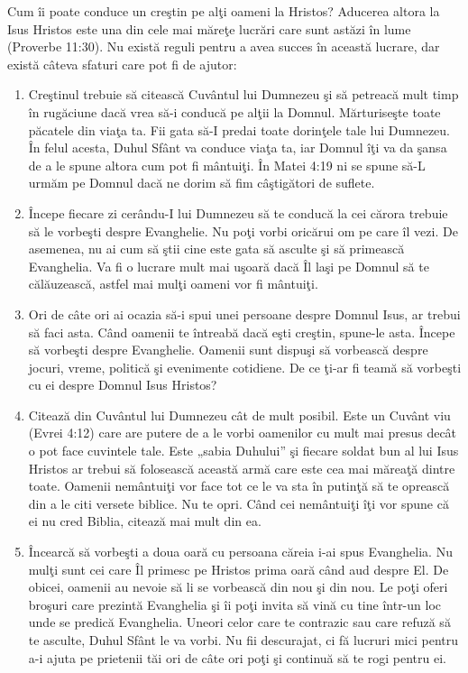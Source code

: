\newpage


Cum îi poate conduce un creştin pe alţi oameni la Hristos? Aducerea altora la Isus Hristos este una din cele mai măreţe lucrări care sunt astăzi în lume (Proverbe 11:30). Nu există reguli pentru a avea succes în această lucrare, dar există câteva sfaturi care pot fi de ajutor:

\begin{enumerate}

	\item Creştinul trebuie să citească Cuvântul lui Dumnezeu şi să petreacă mult timp în rugăciune dacă vrea să-i conducă pe alţii la Domnul. Mărturiseşte toate păcatele din viaţa ta. Fii gata să-I predai toate dorinţele tale lui Dumnezeu. În felul acesta, Duhul Sfânt va conduce viaţa ta, iar Domnul îţi va da şansa de a le spune altora cum pot fi mântuiţi. În Matei 4:19 ni se spune să-L urmăm pe Domnul dacă ne dorim să fim câştigători de suflete.
	
	\item Începe fiecare zi cerându-I lui Dumnezeu să te conducă la cei cărora trebuie să le vorbeşti despre Evanghelie. Nu poţi vorbi oricărui om pe care îl vezi. De asemenea, nu ai cum să ştii cine este gata să asculte şi să primească Evanghelia. Va fi o lucrare mult mai uşoară dacă Îl laşi pe Domnul să te călăuzească, astfel mai mulţi oameni vor fi mântuiţi.
	
	\item Ori de câte ori ai ocazia să-i spui unei persoane despre Domnul Isus, ar trebui să faci asta. Când oamenii te întreabă dacă eşti creştin, spune-le asta. Începe să vorbeşti despre Evanghelie. Oamenii sunt dispuşi să vorbească despre jocuri, vreme, politică şi evenimente cotidiene. De ce ţi-ar fi teamă să vorbeşti cu ei despre Domnul Isus Hristos?
	
	\item Citează din Cuvântul lui Dumnezeu cât de mult posibil. Este un Cuvânt viu (Evrei 4:12) care are putere de a le vorbi oamenilor cu mult mai presus decât o pot face cuvintele tale. Este „sabia Duhului” şi fiecare soldat bun al lui Isus Hristos ar trebui să folosească această armă care este cea mai măreaţă dintre toate. Oamenii nemântuiţi vor face tot ce le va sta în putinţă să te oprească din a le citi versete biblice. Nu te opri. Când cei nemântuiţi îţi vor spune că ei nu cred Biblia, citează mai mult din ea.
	
	\item Încearcă să vorbeşti a doua oară cu persoana căreia i-ai spus Evanghelia. Nu mulţi sunt cei care Îl primesc pe Hristos prima oară când aud despre El. De obicei, oamenii au nevoie să li se vorbească din nou şi din nou. Le poţi oferi broşuri care prezintă Evanghelia şi îi poţi invita să vină cu tine într-un loc unde se predică Evanghelia. Uneori celor care te contrazic sau care refuză să te asculte, Duhul Sfânt le va vorbi. Nu fii descurajat, ci fă lucruri mici pentru a-i ajuta pe prietenii tăi ori de câte ori poţi şi continuă să te rogi pentru ei.
	

\end{enumerate}
